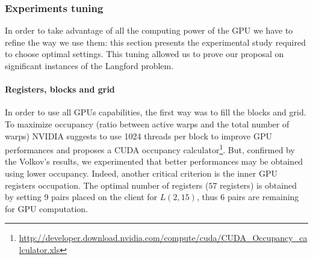 
\subsubsection{Experiments tuning}

In order to take advantage of all the computing power of the GPU we have to refine the way we use them: this section presents the experimental study required to choose optimal settings. This tuning allowed us to prove our proposal on significant instances of the Langford problem.

\paragraph{Registers, blocks and grid}

In order to use all GPUs capabilities, the first way was to fill the blocks and grid. To maximize occupancy (ratio between active warps and the total number of warps) NVIDIA suggests to use 1024 threads per block to improve GPU performances and proposes a CUDA occupancy calculator\footnote{\url{http://developer.download.nvidia.com/compute/cuda/CUDA_Occupancy_calculator.xls}}. But, confirmed by the Volkov's results\cite{Volkov}, we experimented that better performances may be obtained using lower occupancy. Indeed, another critical criterion is the inner GPU registers occupation. 
The optimal number of registers ($57$ registers) is obtained by setting 9 pairs placed on the client for $L(2,15)$, thus 6 pairs are remaining for GPU computation.


